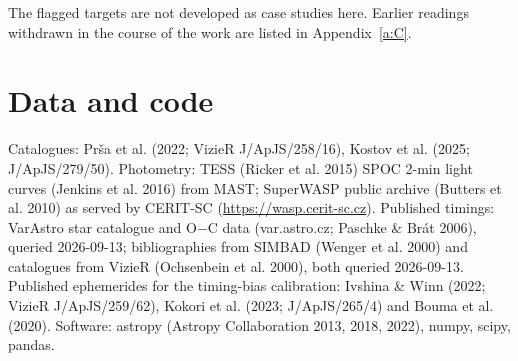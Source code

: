 \documentclass{aa}
\begin{document}
The flagged targets are not developed as case studies here. Earlier readings withdrawn in the course of the work are listed in Appendix~\ref{a:C}.


\section{Data and code}\label{s:data}
\begin{sloppypar}
Catalogues: Prša et al. (2022; VizieR J/ApJS/258/16), Kostov et al. (2025; J/ApJS/279/50). Photometry: TESS (Ricker et al. 2015) SPOC 2-min light curves (Jenkins et al. 2016) from MAST; SuperWASP public archive (Butters et al. 2010) as served by CERIT-SC (\url{https://wasp.cerit-sc.cz}). Published timings: VarAstro star catalogue and O$-$C data (var.astro.cz; Paschke \& Brát 2006), queried 2026-09-13; bibliographies from SIMBAD (Wenger et al. 2000) and catalogues from VizieR (Ochsenbein et al. 2000), both queried 2026-09-13. Published ephemerides for the timing-bias calibration: Ivshina \& Winn (2022; VizieR J/ApJS/259/62), Kokori et al. (2023; J/ApJS/265/4) and Bouma et al. (2020). Software: astropy (Astropy Collaboration 2013, 2018, 2022), numpy, scipy, pandas.

\end{sloppypar}
\end{document}
